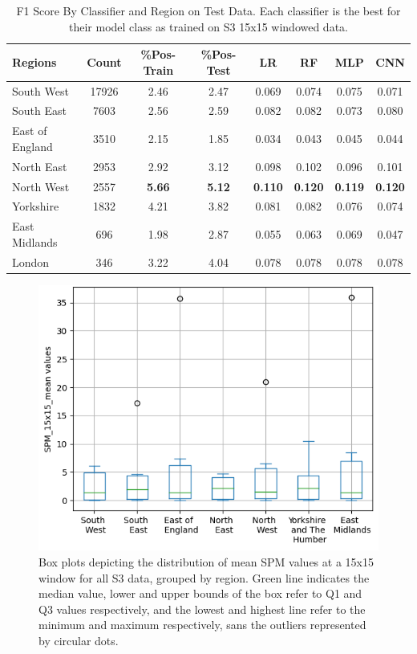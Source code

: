 \documentclass[a4paper,11pt]{report}
\begin{document}
    \begin{table}[H]
        \caption{F1 Score By Classifier and Region on Test Data. Each classifier is the best for their model class as trained on S3 15x15 windowed data.}
        \label{tab:metrics_across_regions}
        \centering
        \begin{tabular}{lccccccc}
        \toprule
        \textbf{Regions} & \textbf{Count} & \textbf{\%Pos-Train} & \textbf{\%Pos-Test} & \textbf{LR} & \textbf{RF} & \textbf{MLP} & \textbf{CNN} \\
        \midrule
        South West & 17926 & 2.46 & 2.47 & 0.069 & 0.074 & 0.075 & 0.071 \\
        South East & 7603 & 2.56 & 2.59 & 0.082 & 0.082 & 0.073 & 0.080  \\ 
        East of England & 3510 & 2.15 & 1.85 & 0.034 & 0.043 & 0.045 & 0.044 \\ 
        North East & 2953 & 2.92 & 3.12 & 0.098 & 0.102 & 0.096 & 0.101 \\
        North West & 2557 & \textbf{5.66} & \textbf{5.12} & \textbf{0.110} & \textbf{0.120} & \textbf{0.119} & \textbf{0.120} \\
        Yorkshire & 1832 & 4.21 & 3.82 & 0.081 & 0.082 & 0.076 & 0.074 \\
        East Midlands & 696 & 1.98 & 2.87 & 0.055 & 0.063 & 0.069 & 0.047 \\
        London & 346 & 3.22 & 4.04 & 0.078 & 0.078 & 0.078 & 0.078 \\\bottomrule
        \end{tabular}
    \end{table}

\begin{figure}[H]

        \centering
        \includegraphics[height=0.5\textwidth]{images/spm_boxplot.png}
        \caption{Box plots depicting the distribution of mean SPM values at a 15x15 window for all S3 data, grouped by region. Green line indicates the median value, lower and upper bounds of the box refer to Q1 and Q3 values respectively, and the lowest and highest line refer to the minimum and maximum respectively, sans the outliers represented by circular dots.}
        \label{fig:spm_by_region}
\end{figure}
\end{document}
